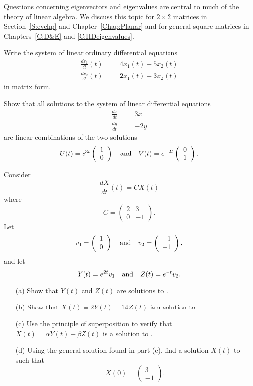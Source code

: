 Questions concerning eigenvectors and eigenvalues are central to
much of the theory of linear algebra.  We discuss this
topic for $2\times 2$ matrices in Section~\ref{S:evchp} and
Chapter~\ref{Chap:Planar} and for general square matrices in
Chapters~\ref{C:D&E} and \ref{C:HDeigenvalues}.

\EXER

\TEXER

\begin{exercise} \label{c4.1.5}
Write the system of linear ordinary differential equations
\begin{eqnarray*}
\frac{dx_1}{dt}(t) & = & 4x_1(t) + 5x_2(t) \\
\frac{dx_2}{dt}(t) & = & 2x_1(t) - 3x_2(t)
\end{eqnarray*}
in matrix form.
\end{exercise}

\begin{exercise} \label{c4.4.4}
Show that all solutions to the system of linear differential equations
\begin{eqnarray*}
\frac{dx}{dt} & = & 3x \\
\frac{dy}{dt} & = & -2y
\end{eqnarray*}
are linear combinations of the two solutions
\[
U(t) = e^{3t}\left(\begin{array}{r} 1 \\ 0\end{array}\right) \quad\mbox{and}\quad V(t) = e^{-2t}\left(\begin{array}{r} 0 \\ 1\end{array}\right).
\]
\end{exercise}

\begin{exercise} \label{c4.5.1}
Consider
\begin{equation}  \label{e:Ceqn}
\frac{dX}{dt}(t) = CX(t)
\end{equation}
where
\[
C=\left(\begin{array}{cr} 2 & 3\\0& -1 \end{array}\right).
\]
Let
\[
v_1=\left(\begin{array}{c} 1\\0\end{array}\right)\quad\mbox{and}\quad
v_2=\left(\begin{array}{r} 1\\-1\end{array}\right),
\]
and let
\[
Y(t)=e^{2t} v_1 \quad\mbox{and}\quad Z(t)=e^{-t}v_2.
\]
\begin{itemize}
\item[(a)] Show that $Y(t)$ and $Z(t)$ are solutions to .
\item[(b)] Show that $X(t)=2Y(t)-14Z(t)$ is a solution to .
\item[(c)] Use the principle of superposition to verify that
$X(t)=\alpha Y(t) + \beta Z(t)$ is a solution to .
\item[(d)] Using the general solution found in part (c), find a solution
$X(t)$ to  such that
\[
X(0) = \left(\begin{array}{r} 3\\-1\end{array}\right).
\]
\end{itemize}
\end{exercise}

